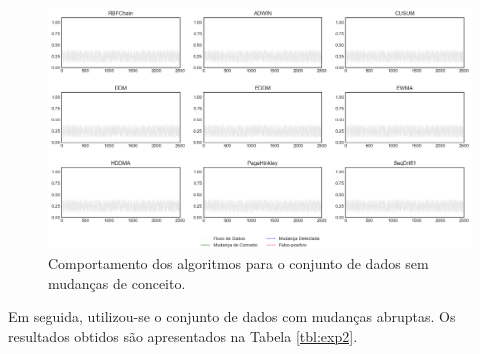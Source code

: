 \documentclass[msc, classic, a4paper]{ufbathesis}
\begin{document}
\begin{landscape}
\begin{figure}[t]
\begin{center}
    \includegraphics[scale=0.65]{imagens/nochange.png}
    \caption{Comportamento dos algoritmos para o conjunto de dados sem mudanças de conceito.}
    \label{fig:exp_sem_mudancas}
\end{center}
\end{figure}
\end{landscape}

Em seguida, utilizou-se o conjunto de dados com mudanças abruptas.
Os resultados obtidos são apresentados na Tabela \ref{tbl:exp2}.
\end{document}
